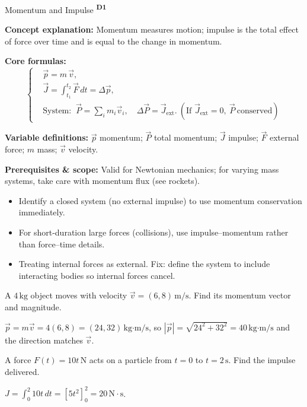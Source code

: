 ﻿\documentclass[12pt,a4paper]{article}
\providecommand{\KPFormulas}{}
\providecommand{\KPHeuristics}{}
\providecommand{\KPProblems}{}
\newcommand{\DOne}{\texorpdfstring{\textsuperscript{\textbf{D1}}}{ D1}}
\begin{document}
\begin{KnowledgePoint}{Momentum and Impulse \DOne}
  \KPFormulas
  \begin{formulabox}
  \textbf{Concept explanation:} Momentum measures motion; impulse is the total effect of force over time and is equal to the change in momentum.

  \textbf{Core formulas:}
  \[
  \left\{\begin{aligned}
    &\vec p=m\,\vec v,\\
    &\vec J=\int_{t_1}^{t_2} \vec F\,dt=\Delta\vec p,\\
    &\text{System: }\ \vec P=\sum_i m_i\vec v_i,\quad \Delta\vec P=\vec J_{\text{ext}}.\ (\text{If }\vec J_{\text{ext}}=0,\ \vec P\ \text{conserved})
  \end{aligned}\right.
  \]

  \textbf{Variable definitions:} $\vec p$ momentum; $\vec P$ total momentum; $\vec J$ impulse; $\vec F$ external force; $m$ mass; $\vec v$ velocity.

  

  \textbf{Prerequisites \& scope:} Valid for Newtonian mechanics; for varying mass systems, take care with momentum flux (see rockets).
  \end{formulabox}

  \KPHeuristics
  \begin{heuristicsbox}
  \begin{itemize}[leftmargin=*]
    \item Identify a closed system (no external impulse) to use momentum conservation immediately.
    \item For short-duration large forces (collisions), use impulse–momentum rather than force–time details.
  \end{itemize}
  \vspace{0.4em}
  \begin{itemize}[leftmargin=*]
    \item Treating internal forces as external. Fix: define the system to include interacting bodies so internal forces cancel.
  \end{itemize}
  \end{heuristicsbox}

  \KPProblems
\begin{cheatproblem}
  A $4\,\text{kg}$ object moves with velocity $\vec v=(6,8)\,\text{m/s}$. Find its momentum vector and magnitude.
\begin{solutionbox}
  $\vec p=m\vec v=4(6,8)=(24,32)\,\text{kg·m/s}$, so $|\vec p|=\sqrt{24^2+32^2}=40\,\text{kg·m/s}$ and the direction matches $\vec v$.
\end{solutionbox}
\end{cheatproblem}
\begin{cheatproblem}
  A force $F(t)=10t\,\text{N}$ acts on a particle from $t=0$ to $t=2\,\text{s}$. Find the impulse delivered.
\begin{solutionbox}
  $J=\int_0^2 10t\,dt=\left[5t^2\right]_0^2=20\,\text{N}\cdot\text{s}$.
\end{solutionbox}
\end{cheatproblem}
\end{KnowledgePoint}
\end{document}
